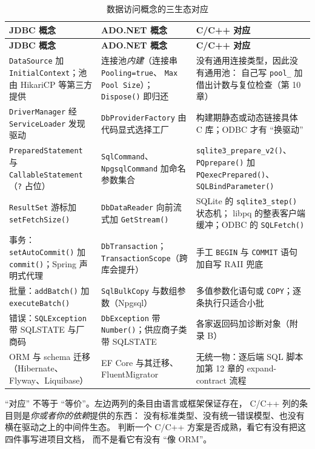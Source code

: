 \documentclass[12pt,a4paper,fontset=fandol]{ctexbook}
\newcommand{\Fn}[1]{\texttt{#1()}}
\newcommand{\Tp}[1]{\texttt{#1}}
\newcommand{\CppJava}{C/C++}
\begin{document}
\begin{scriptsize}
\setlength{\tabcolsep}{3pt}
\begin{longtable}{@{}>{\raggedright\arraybackslash}p{}
                  >{\raggedright\arraybackslash}p{}
                  >{\raggedright\arraybackslash}p{}@{}}
\caption{数据访问概念的三生态对应}\\
\toprule
\textbf{JDBC 概念} & \textbf{ADO.NET 概念} & \textbf{\CppJava{} 对应} \\
\midrule
\endfirsthead
\toprule
\textbf{JDBC 概念} & \textbf{ADO.NET 概念} & \textbf{\CppJava{} 对应} \\
\midrule
\endhead
\Tp{DataSource} 加 \Tp{InitialContext}；池由 HikariCP 等第三方提供 &
连接池\emph{内建}（连接串 \Tp{Pooling=true}、
\Tp{Max Pool Size}）；\Fn{Dispose} 即归还 &
没有通用连接类型，因此没有通用池：
自己写 \Tp{pool\_} 加借出计数与复位检查（第 10 章） \\
\Tp{DriverManager} 经 \Tp{ServiceLoader} 发现驱动 &
\Tp{DbProviderFactory} 由代码显式选择工厂 &
构建期静态或动态链接具体 C 库；ODBC 才有 ``换驱动'' \\
\Tp{PreparedStatement} 与 \Tp{CallableStatement}（\texttt{?} 占位） &
\Tp{SqlCommand}、\Tp{NpgsqlCommand} 加命名参数集合 &
\Fn{sqlite3\_prepare\_v2}、\Fn{PQprepare} 加
\Fn{PQexecPrepared}、\Fn{SQLBindParameter} \\
\Tp{ResultSet} 游标加 \Fn{setFetchSize} &
\Tp{DbDataReader} 向前流式加 \Fn{GetStream} &
SQLite 的 \Fn{sqlite3\_step} 状态机；
libpq 的整表客户端缓冲；ODBC 的 \Fn{SQLFetch} \\
事务：\Fn{setAutoCommit} 加 \Fn{commit}；Spring 声明式代理 &
\Tp{DbTransaction}；\Tp{TransactionScope}（跨库会提升） &
手工 \Tp{BEGIN} 与 \Tp{COMMIT} 语句加自写 RAII 兜底 \\
批量：\Fn{addBatch} 加 \Fn{executeBatch} &
\Tp{SqlBulkCopy} 与数组参数（Npgsql） &
多值参数化语句或 \Tp{COPY}；逐条执行只适合小批 \\
错误：\Tp{SQLException} 带 SQLSTATE 与厂商码 &
\Tp{DbException} 带 \Fn{Number}；供应商子类带 SQLSTATE &
各家返回码加诊断对象（附录 B） \\
ORM 与 schema 迁移（Hibernate、Flyway、Liquibase） &
EF Core 与其迁移、FluentMigrator &
无统一物：逐后端 SQL 脚本加第 12 章的 expand-contract 流程 \\
\bottomrule
\end{longtable}
\end{scriptsize}

\begin{note}[title=两张对照表的读法]
``对应'' 不等于 ``等价''。左边两列的条目由语言或框架保证存在，
\CppJava{} 列的条目则是\emph{你或者你的依赖}提供的东西：
没有标准类型、没有统一错误模型、也没有横在驱动之上的中间件生态。
判断一个 \CppJava{} 方案是否成熟，看它有没有把这四件事写进项目文档，
而不是看它有没有 ``像 ORM''。
\end{note}
\end{document}
